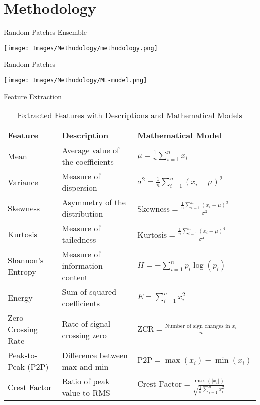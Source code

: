 \section{Methodology}
\begin{frame}{Random Patches Ensemble}
  
  \centering
  \texttt{[image: Images/Methodology/methodology.png]} %
\end{frame}

\begin{frame}{Random Patches }

    \centering
    \texttt{[image: Images/Methodology/ML-model.png]}
    
\end{frame}

\begin{frame}{Feature Extraction}
    \begin{tiny}
    \begin{table}[h!]
        \centering
        \caption{Extracted Features with Descriptions and Mathematical Models}
        \label{tab:features}
        \begin{tabular}{lp{8em}l}
        \toprule
        \textbf{Feature} & \textbf{Description} & \textbf{Mathematical Model} \\
        \midrule
        Mean & Average value of the coefficients & $\mu = \frac{1}{n} \sum_{i=1}^{n} x_i$ \\
        Variance & Measure of dispersion & $\sigma^2 = \frac{1}{n} \sum_{i=1}^{n} (x_i - \mu)^2$ \\
        Skewness & Asymmetry of the distribution & $\text{Skewness} = \frac{\frac{1}{n} \sum_{i=1}^{n} (x_i - \mu)^3}{\sigma^3}$ \\
        Kurtosis & Measure of tailedness & $\text{Kurtosis} = \frac{\frac{1}{n} \sum_{i=1}^{n} (x_i - \mu)^4}{\sigma^4}$ \\
        Shannon's Entropy & Measure of information content & $H = -\sum_{i=1}^{n} p_i \log(p_i)$ \\
        Energy & Sum of squared coefficients & $E = \sum_{i=1}^{n} x_i^2$ \\
        Zero Crossing Rate & Rate of signal crossing zero & $\text{ZCR} = \frac{\text{Number of sign changes in } x_i}{n}$ \\
        Peak-to-Peak (P2P) & Difference between max and min & $\text{P2P} = \max(x_i) - \min(x_i)$ \\
        Crest Factor & Ratio of peak value to RMS & $\text{Crest Factor} = \frac{\max(|x_i|)}{\sqrt{\frac{1}{n} \sum_{i=1}^{n} x_i^2}}$ \\
        \bottomrule
        \end{tabular}
    \end{table}
    \end{tiny}

    
\end{frame}
